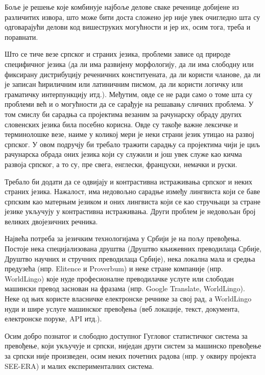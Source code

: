 {\begin{multicols}{2}
Боље је решење које комбинује најбоље делове сваке реченице добијене из различитих извора, што може бити доста сложено јер није увек очигледно шта су одговарајући делови код вишеструких могућности и јер их, осим тога, треба и поравнати. 


Што се тиче везе српског и страних језика, проблеми зависе од природе специфичног језика (да ли има развијену морфологију, да ли има слободну или фиксирану дистрибуцију реченичних конституената, да ли користи чланове, да ли је записан ћириличним или латиничним писмом, да ли користи логичку или граматичку интерпункцију итд.). Међутим, овде се не ради само о томе шта су проблеми већ и о могућности да се сарађује на решавању сличних проблема. У том смислу би сарадња са пројектима везаним за рачунарску обраду других словенских језика била посебно корисна. Овде су такође важне лексичке и терминолошке везе, наиме у коликој мери је неки страни језик утицао на развој српског. У овом подручју би требало тражити сарадњу са пројектима чији је циљ рачунарска обрада оних језика који су служили и још увек служе као кичма развоја српског, а то су, пре свега, енглески, француски, немачки и руски.

Требало би додати да се одвијају и контрастивна истраживања српског и неких страних језика. Нажалост, има недовољно сарадње између лингвиста који се баве српским као матерњим језиком и оних лингвиста који се као стручњаци за стране језике укључују у контрастивна истраживања. Други проблем је недовољан број великих двојезичних речника. 

Највећа потреба за језичким технологијама у Србији је на пољу превођења. Постоје нека специјализована друштва (Друштво књижевних преводилаца Србије, Друштво научних и стручних преводилаца Србије), нека локална мала и средња предузећа (нпр. Elitence и Proverbum) и неке стране компаније (нпр. World\-Lingo) које нуде професионалне преводилачке услуге или слободан машински превод заснован на фразама (нпр. Google Translate, World\-Lingo). Неке од њих користе власничке електронске речнике за свој рад, а World\-Lingo нуди и шире услуге машинског превођења (веб локације, текст, документа, електронске поруке, API итд.).

Осим добро познатог и слободно доступног Гугловог статистичког система за превођење, који укључује и српски, ниједан други систем за машинско превођење за српски није произведен, осим неких почетних радова (нпр. у оквиру пројекта SEE-ERA) и малих експерименталних система.


\end{multicols}}
